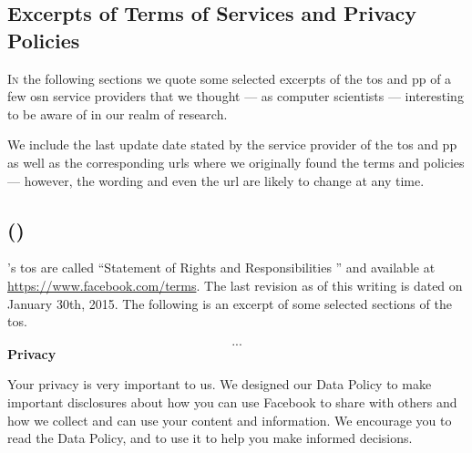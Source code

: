\documentclass[showtrims,oldfontcommands]{kthesis}
\makeatletter
\newcommand*{\greek}[1]{%
   \expandafter\@greek\csname c@#1\endcsname
}
\newcommand*{\@greek}[1]{%
   $\ifcase#1\or\alpha\or\beta\or\gamma\or\delta\or\varepsilon
     \or\zeta\or\eta\or\theta\or\iota\or\kappa\or\lambda
     \or\mu\or\nu\or\xi\or o\or\pi\or\varrho\or\sigma
     \or\tau\or\upsilon\or\phi\or\chi\or\psi\or\omega
     \else\@ctrerr\fi$%
}
\makeatother
\begin{document}
\begin{appendices}
    \addappheadtotoc
    \renewcommand\thechapter{\greek{chapter}}
    \renewcommand\thesection{\thechapter.\greek{section}}

    \chapter{Excerpts of Terms of Services and Privacy Policies}
        \label{chapter:excerpts-of-tos-and-pp}
    
    \lettrine{\textcolor[gray]{.25}{I}}{n} the following sections we quote some 
    selected excerpts of the \ac{tos} and \ac{pp} of a few \ac{osn} service providers 
    that we thought --- as computer scientists --- interesting to be aware of in 
    our realm of research.
    
    We include the last update date stated by the service provider of the \ac{tos} 
    and \ac{pp} as well as the corresponding \acp{url} where we originally found 
    the terms and policies --- however, the wording and even the \ac{url} are likely 
    to change at any time.

    \section[\Facebook]{\Facebook (\FacebookInc)}
        \label{section:excerpts-facebook}
    \Facebook's \acs{tos} are called ``Statement of Rights and Responsibilities
    '' and available at \url{https://www.facebook.com/terms}. The last revision as of 
    this writing is dated on January 30th, 2015. The following is an excerpt of some 
    selected sections of the \ac{tos}.

    \begin{quote_tos}
        \[...\]
        \textbf{Privacy}

        Your privacy is very important to us. We designed our Data Policy to make important 
        disclosures about how you can use Facebook to share with others and how we collect 
        and can use your content and information. We encourage you to read the Data Policy, 
        and to use it to help you make informed decisions. 


\end{quote_tos}
\end{appendices}
\end{document}
